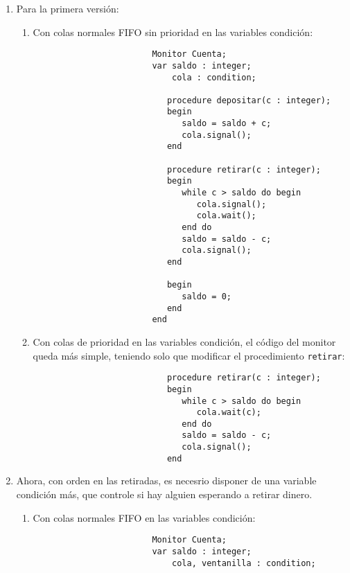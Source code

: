 \begin{ejercicio}
    \begin{enumerate}
        \item Para la primera versión:
            \begin{enumerate}[label=\alph*)]
                \item Con colas normales FIFO sin prioridad en las variables condición:
                    \begin{verbatim}
                        Monitor Cuenta;
                        var saldo : integer;
                            cola : condition;

                           procedure depositar(c : integer);
                           begin
                              saldo = saldo + c;
                              cola.signal();
                           end

                           procedure retirar(c : integer);
                           begin
                              while c > saldo do begin
                                 cola.signal();
                                 cola.wait();
                              end do
                              saldo = saldo - c;
                              cola.signal();
                           end

                           begin
                              saldo = 0;
                           end
                        end
                    \end{verbatim}
                \item Con colas de prioridad en las variables condición, el código del monitor queda más simple, teniendo solo que modificar el procedimiento \verb|retirar|:
                    \begin{verbatim}
                           procedure retirar(c : integer);
                           begin
                              while c > saldo do begin
                                 cola.wait(c);
                              end do
                              saldo = saldo - c;
                              cola.signal();
                           end
                    \end{verbatim}
            \end{enumerate}
        \item Ahora, con orden en las retiradas, es necesrio disponer de una variable condición más, que controle si hay alguien esperando a retirar dinero.
            \begin{enumerate}[label=\alph*)]
                \item Con colas normales FIFO en las variables condición:
                    \begin{verbatim}
                        Monitor Cuenta;
                        var saldo : integer;
                            cola, ventanilla : condition;


\end{verbatim}
\end{enumerate}
\end{enumerate}
\end{ejercicio}
